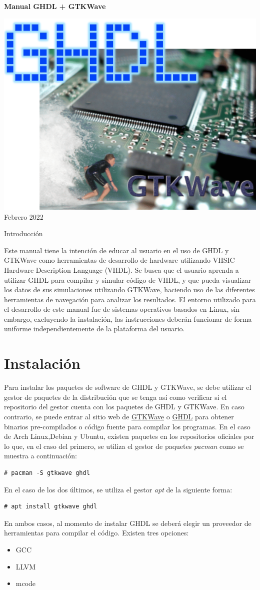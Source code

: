 \documentclass[11pt]{article}
\newcommand{\manualtitle}[3]{
    \begingroup
        \centering
        \vspace*{2\baselineskip}
    {\Huge\textbf{#1}}\vspace*{.4\textwidth}\par
    \includegraphics[width=.5\linewidth]{logo2.png}\vfill
#2\par\vspace*{\baselineskip}
        \endgroup
        \newpage
}
\begin{document}
\manualtitle{Manual GHDL + GTKWave}{Febrero 2022}


\section{Introducción} 
\setcounter{page}{1}

Este manual tiene la intención de educar al usuario
en el uso de GHDL y GTKWave como herramientas de desarrollo de
hardware utilizando VHSIC Hardware Description Language (VHDL). Se busca
que el usuario aprenda a utilizar GHDL para compilar y simular código de
VHDL, y que pueda visualizar los datos de sus simulaciones utilizando
GTKWave, haciendo uso de las diferentes herramientas de navegación para
analizar los resultados. El entorno utilizado para el desarrollo de este manual
fue de sistemas operativos basados en Linux, sin embargo, excluyendo
la instalación, las instrucciones deberán funcionar de forma uniforme
independientemente de la plataforma del usuario.

\section{Instalación} 
Para instalar los paquetes de software de GHDL
y GTKWave, se debe utilizar el gestor de paquetes de la distribución que se
tenga así como verificar si el repositorio del gestor cuenta con los
paquetes de GHDL y GTKWave. En caso contrario, se puede entrar al sitio web de
\href{http://gtkwave.sourceforge.net/}{GTKWave}
o \href{https://ghdl.github.io/ghdl/getting.html}{GHDL} para obtener binarios
pre-compilados o código fuente para compilar los programas. En el caso de Arch
Linux,Debian y Ubuntu, existen paquetes en los repositorios oficiales por lo que, en el caso 
del primero, se utiliza el gestor de paquetes \textit{pacman} como se muestra a continuación:
\begin{Verbatim}[frame=single] 
# pacman -S gtkwave ghdl 
\end{Verbatim} 
En el caso de los dos últimos, se utiliza el gestor \textit{apt} de la siguiente
forma: 
\begin{Verbatim}[frame=single] 
# apt install gtkwave ghdl
\end{Verbatim} 
En ambos casos, al momento de instalar GHDL se deberá elegir
un proveedor de herramientas para compilar el código. Existen tres opciones: 
\begin{itemize} 
    \item GCC 
    \item LLVM 
    \item mcode 
\end{itemize}
\end{document}
